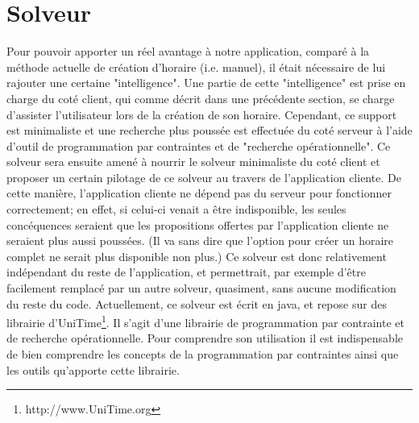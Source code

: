\chapter{Solveur}




Pour pouvoir apporter un réel avantage à notre application, comparé à la méthode actuelle de création d'horaire (i.e. manuel), il était nécessaire de lui rajouter une certaine "intelligence". 
Une partie de cette "intelligence" est prise en charge du coté client, qui comme décrit dans une précédente section, se charge d'assister l'utilisateur lors de la création de son horaire.
\newline
\indent
Cependant, ce support est minimaliste et une recherche plus poussée est effectuée du coté serveur à l'aide d'outil de programmation par contraintes et de "recherche opérationnelle".  Ce solveur sera ensuite amené à nourrir le solveur minimaliste du coté client et proposer un certain pilotage de ce solveur au travers de l'application cliente. 
De cette manière, l'application cliente ne dépend pas du serveur pour fonctionner correctement; en effet, si celui-ci venait a être indisponible, les seules concéquences seraient que les propositions offertes par l'application cliente ne seraient plus aussi poussées. 
(Il va sans dire que l'option pour créer un horaire complet ne serait plus disponible non plus.)
\newline
\indent
Ce solveur est donc relativement indépendant du reste de l'application, et permettrait, par exemple d'être facilement remplacé par un autre solveur, quasiment, sans aucune modification du reste du code.
Actuellement, ce solveur est écrit en java, et repose sur des librairie d'UniTime\footnote{http://www.UniTime.org}. Il s'agit d'une librairie de programmation par contrainte et de recherche opérationnelle.
Pour comprendre son utilisation il est indispensable de bien comprendre les concepts de la programmation par contraintes ainsi que les outils qu'apporte cette librairie.

